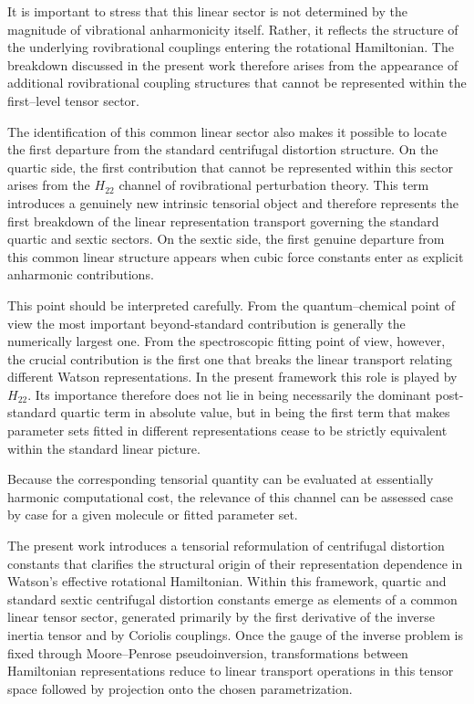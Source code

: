 It is important to stress that this linear sector is not determined by
the magnitude of vibrational anharmonicity itself.
Rather, it reflects the structure of the underlying rovibrational
couplings entering the rotational Hamiltonian.
The breakdown discussed in the present work therefore arises from the
appearance of additional rovibrational coupling structures that cannot
be represented within the first--level tensor sector.

The identification of this common linear sector also makes it possible
to locate the first departure from the standard centrifugal distortion
structure.
On the quartic side, the first contribution that cannot be represented
within this sector arises from the $H_{22}$ channel of rovibrational
perturbation theory.
This term introduces a genuinely new intrinsic tensorial object and
therefore represents the first breakdown of the linear representation
transport governing the standard quartic and sextic sectors.
On the sextic side, the first genuine departure from this common linear
structure appears when cubic force constants enter as explicit
anharmonic contributions.

This point should be interpreted carefully.
From the quantum--chemical point of view the most important
beyond-standard contribution is generally the numerically largest one.
From the spectroscopic fitting point of view, however, the crucial
contribution is the first one that breaks the linear transport relating
different Watson representations.
In the present framework this role is played by $H_{22}$.
Its importance therefore does not lie in being necessarily the dominant
post-standard quartic term in absolute value, but in being the first
term that makes parameter sets fitted in different representations cease
to be strictly equivalent within the standard linear picture.

Because the corresponding tensorial quantity can be evaluated at
essentially harmonic computational cost, the relevance of this channel
can be assessed case by case for a given molecule or fitted parameter
set.

The present work introduces a tensorial reformulation of centrifugal
distortion constants that clarifies the structural origin of their
representation dependence in Watson's effective rotational Hamiltonian.
Within this framework, quartic and standard sextic centrifugal
distortion constants emerge as elements of a common linear tensor
sector, generated primarily by the first derivative of the inverse
inertia tensor and by Coriolis couplings. Once the gauge of the inverse
problem is fixed through Moore--Penrose pseudoinversion,
transformations between Hamiltonian representations reduce to linear
transport operations in this tensor space followed by projection onto
the chosen parametrization.

